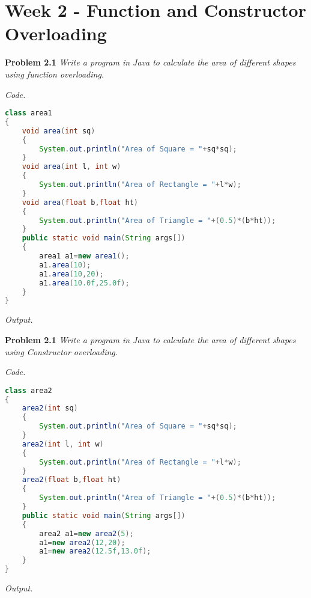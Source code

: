\documentclass[12pt]{article}
\begin{document}
\newpage


\setlength{\fboxrule}{.5mm}\setlength{\fboxsep}{1.2mm}
\addtolength{\boxlength}{-4mm}
\begin{center}\end{center}
\vspace{5mm}

\section{Week 2 - Function and Constructor Overloading}


\textbf{Problem 2.1} \textit{Write a program in Java to calculate the area of different shapes using function overloading.}


\textit{Code.}

\begin{lstlisting}[language=Java]
class area1
{
	void area(int sq)
	{
		System.out.println("Area of Square = "+sq*sq);
	}
	void area(int l, int w)
	{
		System.out.println("Area of Rectangle = "+l*w);
	}
	void area(float b,float ht)
	{
		System.out.println("Area of Triangle = "+(0.5)*(b*ht));
	}
	public static void main(String args[])
	{
		area1 a1=new area1();
		a1.area(10);
		a1.area(10,20);
		a1.area(10.0f,25.0f);
	}
}
\end{lstlisting}

\textit{Output.}


\textbf{Problem 2.1} \textit{Write a program in Java to calculate the area of different shapes using Constructor overloading.}


\textit{Code.}

\begin{lstlisting}[language=Java]
class area2
{
	area2(int sq)
	{
		System.out.println("Area of Square = "+sq*sq);
	}
	area2(int l, int w)
	{
		System.out.println("Area of Rectangle = "+l*w);
	}
	area2(float b,float ht)
	{
		System.out.println("Area of Triangle = "+(0.5)*(b*ht));
	}
	public static void main(String args[])
	{
		area2 a1=new area2(5);
		a1=new area2(12,20);
		a1=new area2(12.5f,13.0f);
	}
}
\end{lstlisting}

\textit{Output.}

\newpage
\end{document}

